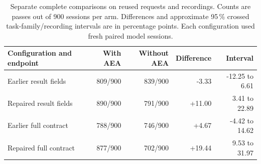 \begin{table}[!htbp]
\centering\small
\caption{Separate complete comparisons on reused requests and recordings. Counts are passes out of 900 sessions per arm. Differences and approximate 95\,\% crossed task-family/recording intervals are in percentage points. Each configuration used fresh paired model sessions.}
\label{tab:repair-validation}
\begin{tabular}{lrrrr}
\toprule
Configuration and endpoint & With AEA & Without AEA & Difference & Interval \\
\midrule
Earlier result fields & 809/900 & 839/900 & -3.33 & -12.25 to 6.61 \\
Repaired result fields & 890/900 & 791/900 & +11.00 & 3.41 to 22.89 \\
Earlier full contract & 788/900 & 746/900 & +4.67 & -4.42 to 14.62 \\
Repaired full contract & 877/900 & 702/900 & +19.44 & 9.53 to 31.97 \\
\bottomrule
\end{tabular}
\end{table}
